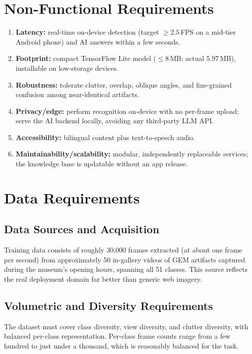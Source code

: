 \section{Non-Functional Requirements}

\begin{enumerate}[label=\textbf{NFR-\arabic*.},leftmargin=3.4em]
  \item \textbf{Latency:} real-time on-device detection (target $\geq 2.5$\,FPS
        on a mid-tier Android phone) and AI answers within a few seconds.
  \item \textbf{Footprint:} compact TensorFlow Lite model ($\leq 8$\,MB; actual
        5.97\,MB), installable on low-storage devices.
  \item \textbf{Robustness:} tolerate clutter, overlap, oblique angles, and
        fine-grained confusion among near-identical artifacts.
  \item \textbf{Privacy/edge:} perform recognition on-device with no per-frame
        upload; serve the AI backend locally, avoiding any third-party LLM API.
  \item \textbf{Accessibility:} bilingual content plus text-to-speech audio.
  \item \textbf{Maintainability/scalability:} modular, independently replaceable
        services; the knowledge base is updatable without an app release.
\end{enumerate}

\section{Data Requirements}

\subsection{Data Sources and Acquisition}
Training data consists of roughly 30{,}000 frames extracted (at about one frame per
second) from approximately 50 in-gallery videos of GEM artifacts captured during
the museum's opening hours, spanning all 51 classes. This source reflects the real
deployment domain far better than generic web imagery.

\subsection{Volumetric and Diversity Requirements}
The dataset must cover class diversity, view diversity, and clutter diversity, with
balanced per-class representation. Per-class frame counts range from a few hundred to
just under a thousand, which is reasonably balanced for the task.

